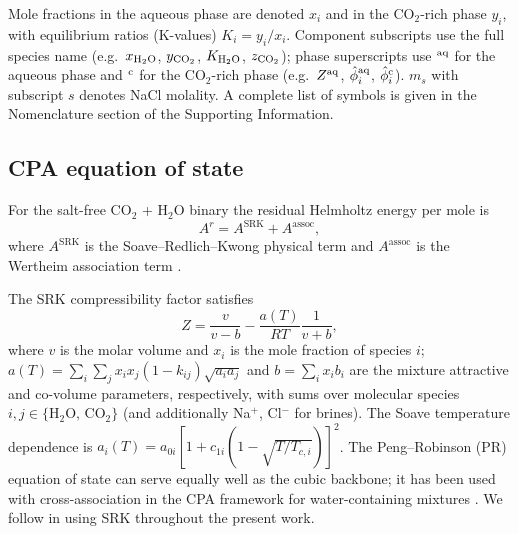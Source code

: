 \documentclass[preprint,12pt,number]{elsarticle}
\begin{document}
Mole fractions in the aqueous phase are denoted $x_i$ and in the CO$_2$-rich phase $y_i$,
with equilibrium ratios (K-values) $K_i = y_i/x_i$.
Component subscripts use the full species name (e.g.\ $x_{\rm H_2O}$,
$y_{\rm CO_2}$, $K_{\rm H_2O}$, $z_{\rm CO_2}$); phase superscripts use
$^{\rm aq}$ for the aqueous phase and $^{\rm c}$ for the CO$_2$-rich phase
(e.g.\ $Z^{\rm aq}$, $\hat{\phi}_i^{\rm aq}$, $\hat{\phi}_i^{\rm c}$).
$m_s$ with subscript $s$ denotes NaCl molality.
A complete list of symbols is given in the Nomenclature section of the Supporting Information.

\subsection{CPA equation of state}
\label{sec:cpa}

For the salt-free CO$_2$ + H$_2$O binary the residual Helmholtz energy per mole is
\begin{equation}
  A^r = A^{\text{SRK}} + A^{\text{assoc}},
  \label{eq:Ar_cpa}
\end{equation}
where $A^{\text{SRK}}$ is the Soave--Redlich--Kwong \citep{Soave1972} physical term and
$A^{\text{assoc}}$ is the Wertheim association term \citep{Wertheim1984}.

The SRK compressibility factor satisfies
\begin{equation}
  Z = \frac{v}{v-b} - \frac{a(T)}{RT}\frac{1}{v+b},
  \label{eq:Z_srk}
\end{equation}
where $v$ is the molar volume and $x_i$ is the mole fraction of species $i$;
$a(T) = \sum_i \sum_j x_i x_j (1-k_{ij})\sqrt{a_i a_j}$
and $b = \sum_i x_i b_i$ are the mixture attractive and co-volume parameters, respectively,
with sums over molecular species $i, j \in \{\text{H}_2\text{O},\, \text{CO}_2\}$
(and additionally Na$^+$, Cl$^-$ for brines).
The Soave temperature dependence is
$a_i(T) = a_{0i}[1 + c_{1i}(1 - \sqrt{T/T_{c,i}})]^2$.
The Peng--Robinson (PR) equation of state \citep{PengRobinson1976} can serve equally well as
the cubic backbone; it has been used with cross-association in the CPA framework for
water-containing mixtures \citep{LiFiroozabadi2009,moortgat2018reservoir, nasrabadi2016new, moortgat2025vapor, moortgat2011three}.
We follow \citet{Coelho2025} in using SRK throughout the present work.
\end{document}

